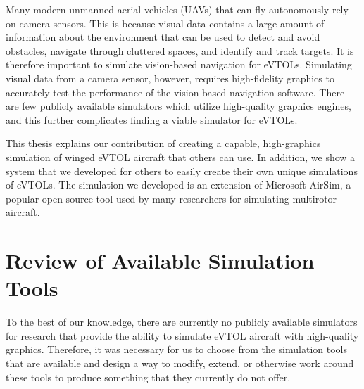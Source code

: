 Many modern unmanned aerial vehicles (UAVs) that can fly autonomously rely on camera sensors. This is because visual data contains a large amount of information about the environment that can be used to detect and avoid obstacles, navigate through cluttered spaces, and identify and track targets. It is therefore important to simulate vision-based navigation for eVTOLs. Simulating visual data from a camera sensor, however, requires high-fidelity graphics to accurately test the performance of the vision-based navigation software. There are few publicly available simulators which utilize high-quality graphics engines, and this further complicates finding a viable simulator for eVTOLs.


This thesis explains our contribution of creating a capable, high-graphics simulation of winged eVTOL aircraft that others can use. In addition, we show a system that we developed for others to easily create their own unique simulations of eVTOLs. The simulation we developed is an extension of Microsoft AirSim, a popular open-source tool used by many researchers for simulating multirotor aircraft.

\section{Review of Available Simulation Tools}
To the best of our knowledge, there are currently no publicly available simulators for research that provide the ability to simulate eVTOL aircraft with high-quality graphics. Therefore, it was necessary for us to choose from the simulation tools that are available and design a way to modify, extend, or otherwise work around these tools to produce something that they currently do not offer.

